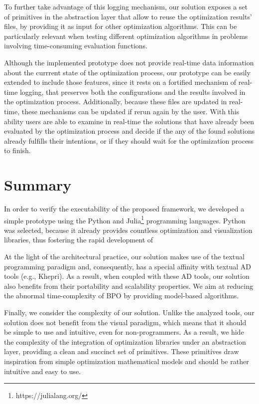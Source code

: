 To further take advantage of this logging mechanism, our solution exposes a set of primitives in the abstraction layer that allow to reuse the optimization results' files, by providing it as input for other optimization algorithms. This can be particularly relevant when testing different optimization algorithms in problems involving time-consuming evaluation functions.


Although the implemented prototype does not provide real-time data information about the currrent state of the optimization process, our prototype can be easily extended to include those features, since it rests on a fortified mechanism of real-time logging, that preserves both the configurations and the results involved in the optimization process. Additionally, because these files are updated in real-time, these mechanisms can be updated if rerun again by the user. With this ability users are able to examine in real-time the solutions that have already been evaluated by the optimization process and decide if the any of the found solutions already fulfills their intentions, or if they should wait for the optimization process to finish. 


\section{Summary}
In order to verify the executability of the proposed framework, we developed a simple prototype using the Python and Julia\footnote{https://julialang.org/} programming languages. Python was selected, because it already provides countless optimization and visualization libraries, thus fostering the rapid development of 


At the light of the architectural practice, our solution makes use of the textual programming paradigm and, consequently, has a special affinity with textual \ac{AD} tools (e.g., Khepri). As a result, when coupled with these \ac{AD} tools, our solution also benefits from their portability and scalability properties. We aim at reducing the abnormal time-complexity of \ac{BPO} by providing model-based algorithms. 

Finally, we consider the complexity of our solution. Unlike the analyzed tools, our solution does not benefit from the visual paradigm, which means that it should be simple to use and intuitive, even for non-programmers. As a result, we hide the complexity of the integration of optimization libraries under an abstraction layer, providing a clean and succinct set of primitives. These primitives draw inspiration from simple optimization mathematical models and should be rather intuitive and easy to use. 

